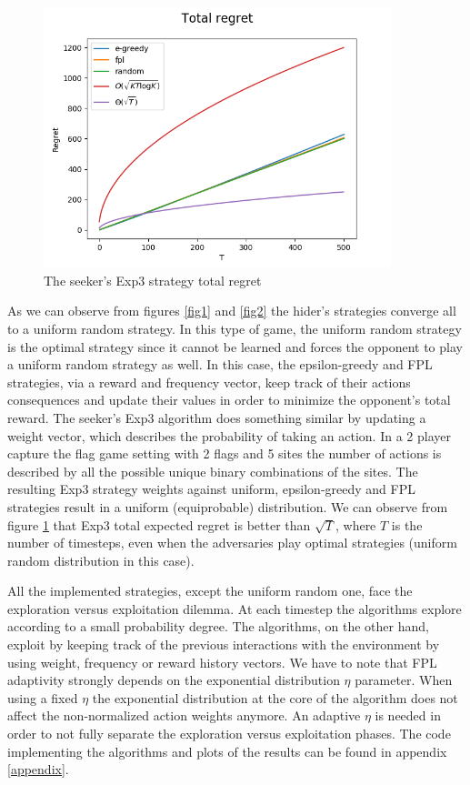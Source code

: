 \documentclass[runningheads]{llncs}
\begin{document}
\begin{figure}[!htb]
    \centering
\includegraphics[width=0.9\textwidth]{img/Figure_3b.png}
\caption{The seeker's Exp3 strategy total regret}\label{fig3}
\end{figure}

As we can observe from figures \ref{fig1} and \ref{fig2} the hider's
strategies converge all to a uniform random strategy. In this type of
game, the uniform random strategy is the optimal strategy since it
cannot be learned and forces the opponent to play a uniform random
strategy as well. In this case, the epsilon-greedy and FPL strategies,
via a reward and frequency vector, keep track of their actions
consequences and update their values in order to minimize the
opponent's total reward. The seeker's Exp3 algorithm does something
similar by updating a weight vector, which describes the probability
of taking an action. In a 2 player capture the flag game setting with 2
flags and 5 sites the number of actions is described by all the
possible unique binary combinations of the sites. The resulting Exp3
strategy weights against uniform, epsilon-greedy and FPL strategies
result in a uniform (equiprobable) distribution. We can observe from
figure \ref{fig3} that Exp3 total expected regret is better than
$\sqrt{T}$, where $T$ is the number of timesteps, even when the
adversaries play optimal strategies (uniform random distribution in
this case).

All the implemented strategies, except the uniform random
one, face the exploration versus exploitation dilemma. At each
timestep the algorithms explore according to a small probability
degree. The algorithms, on the other hand, exploit by keeping track of
the previous interactions with the environment by using weight,
frequency or reward history vectors. We have to note that FPL
adaptivity strongly depends on the exponential distribution $\eta$
parameter. When using a fixed $\eta$ the exponential distribution at
the core of the algorithm does not affect the non-normalized action
weights anymore. An adaptive $\eta$ is needed in order to not fully
separate the exploration versus exploitation phases. The code
implementing the algorithms and plots of the results can be found in
appendix \ref{appendix}.
\end{document}
